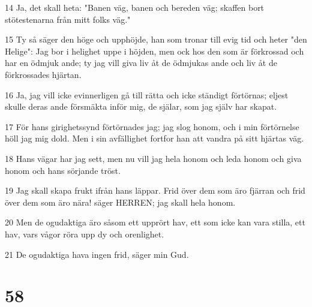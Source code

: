 \par 14 Ja, det skall heta: "Banen väg, banen och bereden väg; skaffen bort stötestenarna från mitt folks väg."
\par 15 Ty så säger den höge och upphöjde, han som tronar till evig tid och heter "den Helige": Jag bor i helighet uppe i höjden, men ock hos den som är förkrossad och har en ödmjuk ande; ty jag vill giva liv åt de ödmjukas ande och liv åt de förkrossades hjärtan.
\par 16 Ja, jag vill icke evinnerligen gå till rätta och icke ständigt förtörnas; eljest skulle deras ande försmäkta inför mig, de själar, som jag själv har skapat.
\par 17 För hans girighetssynd förtörnades jag; jag slog honom, och i min förtörnelse höll jag mig dold. Men i sin avfällighet fortfor han att vandra på sitt hjärtas väg.
\par 18 Hans vägar har jag sett, men nu vill jag hela honom och leda honom och giva honom och hans sörjande tröst.
\par 19 Jag skall skapa frukt ifrån hans läppar. Frid över dem som äro fjärran och frid över dem som äro nära! säger HERREN; jag skall hela honom.
\par 20 Men de ogudaktiga äro såsom ett upprört hav, ett som icke kan vara stilla, ett hav, vars vågor röra upp dy och orenlighet.
\par 21 De ogudaktiga hava ingen frid, säger min Gud.

\chapter{58}

